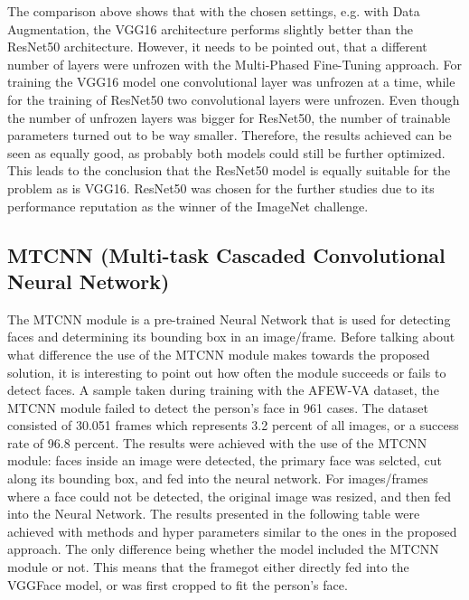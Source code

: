 The comparison above shows that with the chosen settings, e.g. with Data Augmentation, the VGG16 architecture performs slightly better than the ResNet50 architecture. However, it needs to be pointed out, that a different number of layers were unfrozen with the Multi-Phased Fine-Tuning approach. For training the VGG16 model one convolutional layer was unfrozen at a time, while for the training of ResNet50 two convolutional layers were unfrozen. Even though the number of unfrozen layers was bigger for ResNet50, the number of trainable parameters turned out to be way smaller. Therefore, the results achieved can be seen as equally good, as probably both models could still be further optimized. This leads to the conclusion that the ResNet50 model is equally suitable for the problem as is VGG16. ResNet50 was chosen for the further studies due to its performance reputation as the winner of the ImageNet challenge.

\subsection{MTCNN (Multi-task Cascaded Convolutional Neural Network)}
The MTCNN module is a pre-trained Neural Network that is used for detecting faces and determining its bounding box in an image/frame. Before talking about what difference the use of the MTCNN module makes towards the proposed solution, it is interesting to point out how often the module succeeds or fails to detect faces.
\newline\newline
A sample taken during training with the AFEW-VA dataset, the MTCNN module failed to detect the person's face in 961 cases. The dataset consisted of 30.051 frames which represents 3.2 percent of all images, or a success rate of 96.8 percent.
\newline\newline
The results were achieved with the use of the MTCNN module: faces inside an image were detected, the primary face was selcted, cut along its bounding box, and fed into the neural network. For images/frames where a face could not be detected, the original image was resized, and then fed into the Neural Network.
\newline\newline
The results presented in the following table were achieved with methods and hyper parameters similar to the ones in the proposed approach. The only difference being whether the model included the MTCNN module or not. This means that the framegot either directly fed into the VGGFace model, or was first cropped to fit the person's face.


